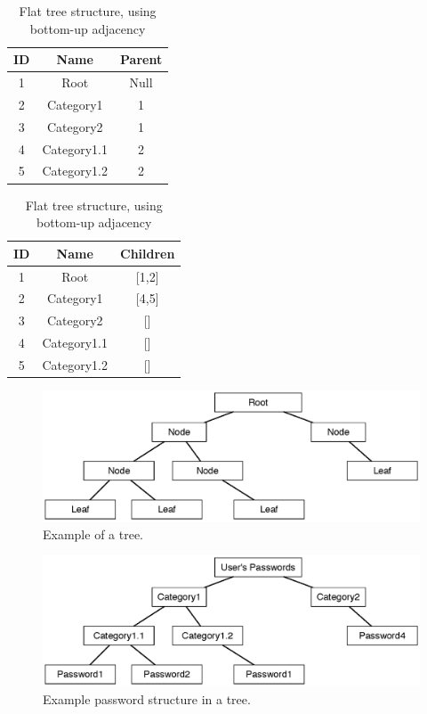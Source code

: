 			\begin{table}[p]
				\centering
				\begin{tabular}{c|c|c}
					\textbf{ID} 	& 	\textbf{Name} 	& \textbf{Parent} 	\\
					\hline
					\hline
					1 				& Root 				& Null 				\\
					2 				& Category1 		& 1 				\\
					3 				& Category2 		& 1 				\\
					4 				& Category1.1 		& 2 				\\
					5 				& Category1.2 		& 2 				\\
				\end{tabular}
				\caption{Flat tree structure, using bottom-up adjacency}
				\label{table:example:tree:buttomup}
			\end{table}
			\begin{table}[p]
				\centering
				\begin{tabular}{c|c|c}
					\textbf{ID} 	& 	\textbf{Name} 	& \textbf{Children} \\
					\hline
					\hline
					1 				& Root 				& [1,2] 			\\
					2 				& Category1 		& [4,5] 			\\
					3 				& Category2 		& [] 				\\
					4 				& Category1.1 		& [] 				\\
					5 				& Category1.2 		& [] 				\\
				\end{tabular}
				\caption{Flat tree structure, using bottom-up adjacency}
				\label{table:example:tree:topdown}
			\end{table}

			\begin{figure}[h!]
				\centering
				\includegraphics[width=\textwidth]{figures/design/general/generic-tree.eps}
				\caption{Example of a tree.}
				\label{fig:example:tree}
			\end{figure}
		
			\begin{figure}[p]
				\centering
				\includegraphics[width=\textwidth]{figures/design/general/password-tree.eps}
				\caption{Example password structure in a tree.}
				\label{fig:example:passwordtree}
			\end{figure}

